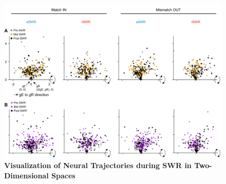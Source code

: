 \documentclass[final,3p,times,twocolumn]{elsarticle}
\begin{document}
        \clearpage
        \begin{figure}[ht]
        	\centering
            \includegraphics[width=1\textwidth]{./src/figures/.png/Figure_ID_06.png}
        	\caption{\textbf{
Visualization of Neural Trajectories during SWR in Two-Dimensional Spaces}
\smallskip
\\
}
\end{figure}
\end{document}
